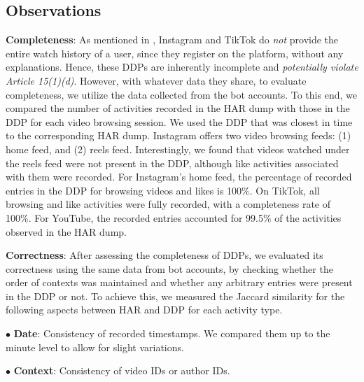 \subsection{Observations}
\label{Sec: Reliability_Observations}

\noindent
\textbf{Completeness}: As mentioned in , 
Instagram and TikTok do \textit{not} provide the entire watch history of a user, since they register on the platform, without any explanations.
Hence, these DDPs are inherently incomplete and \textit{potentially violate Article 15(1)(d)}.  
However, with whatever data they share, to evaluate completeness, we utilize the data collected from the bot accounts.  
To this end, we compared the number of activities recorded in the HAR dump with those in the DDP for each video browsing session. 
We used the DDP that was closest in time to the corresponding HAR dump.
Instagram offers two video browsing feeds: (1) home feed, and (2) reels feed.
Interestingly, we found that videos watched under the reels feed were not present in the DDP, although like activities associated with them were recorded.
For Instagram's home feed, the percentage of recorded entries in the DDP for browsing videos and likes is 100\%.
On TikTok, all browsing and like activities were fully recorded, with a completeness rate of 100\%.
For YouTube, the recorded entries accounted for 99.5\%  
of the activities observed in the HAR dump.  

\noindent
\textbf{Correctness}:
After assessing the completeness of DDPs, we evaluated its correctness using the same data from bot accounts, by checking whether the order of contexts was maintained and whether any arbitrary entries were present in the DDP or not.
To achieve this, we measured the Jaccard similarity for the following aspects between HAR and DDP for each activity type.

\noindent
$\bullet$ \textbf{Date}: Consistency of recorded timestamps. We compared them up to the minute level to allow for slight variations.

\noindent
$\bullet$ \textbf{Context}: Consistency of video IDs or author IDs.

